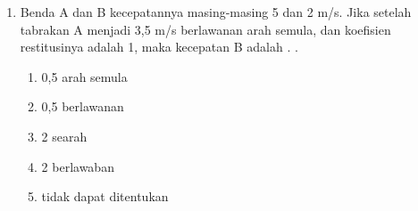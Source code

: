 \documentclass[10pt,a4paper]{extarticle}
\newcommand{\pilgani}[1]{                            \vspace{-0.3cm}\begin{multicols}{2}
 \begin{enumerate}[label=\Alph*., itemsep=0pt,topsep=0pt,leftmargin=*,align=Center]#1                     \end{enumerate}
 \phantom{ini cuma sapi, wedus, dan ayam}
 \end{multicols}}
\begin{document}
\begin{multicols*}{2}
\begin{enumerate}
\vspace{2cm}

\item Benda A dan B kecepatannya masing-masing 5 dan 2 m/s. Jika setelah tabrakan A menjadi 3,5 m/s berlawanan arah semula, dan koefisien restitusinya adalah 1, maka kecepatan B adalah . .
\pilgani{
   \item 0,5 arah semula
   \item 0,5 berlawanan
   \item 2 searah
   \item 2 berlawaban
   \item tidak dapat ditentukan}

\end{enumerate}
\end{multicols*}
\end{document}
